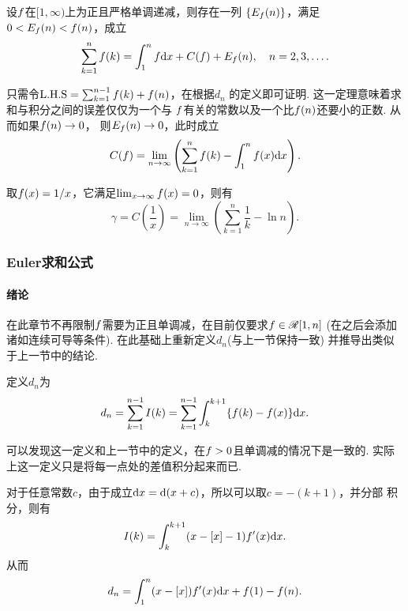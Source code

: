     \begin{thm}
      设$\mathnormal{f}$在$[1,\infty)$上为正且严格单调递减，则存在一列
      $\{E_{\mathnormal{f}}(n)\}$，满足$0<E_{\mathnormal{f}}(n) < \mathnormal{f}(n)$，成立
      \begin{equation}
        \sum_{k=1}^n\mathnormal{f}(k) = \int_1^n\mathnormal{f}\mathrm{d} x + C(\mathnormal{f}) + E_{\mathnormal{f}}(n),
        \quad n = 2,3,\dots.
      \end{equation}
    \end{thm}
    \remark
      只需令$\text{L.H.S} = \sum_{k=1}^{n-1}\mathnormal{f}(k) + \mathnormal{f}(n)$，在根据$d_n$
      的定义即可证明. 这一定理意味着求和与积分之间的误差仅仅为一个与
      $\mathnormal{f}$有关的常数以及一个比$\mathnormal{f}(n)$还要小的正数. 从而如果$\mathnormal{f}(n)\to 0$，
      则$E_{\mathnormal{f}}(n)\to 0$，此时成立
      \begin{equation}
        C(\mathnormal{f}) = \lim_{n\to\infty}\left(
          \sum_{k=1}^n \mathnormal{f}(k) - \int_1^n\mathnormal{f}(x)\mathrm{d} x
        \right).
      \end{equation}

    \begin{defi}[经典Euler常数]
      取$\mathnormal{f}(x) = 1/x$，它满足$\lim_{x\to\infty}\mathnormal{f}(x) = 0$，则有
      \[
        \gamma = C(\frac{1}{x}) = \lim_{n\to\infty}\left(
          \sum_{k=1}^n\frac{1}{k} - \ln n
        \right).
      \]
    \end{defi}

  \subsubsection{Euler求和公式}
    \paragraph{绪论}
      在此章节不再限制$\mathnormal{f}$需要为正且单调减，在目前仅要求$\mathnormal{f}\in\mathscr{R}[1, n]$
      (在之后会添加诸如连续可导等条件). 在此基础上重新定义$d_n$(与上一节保持一致)
      并推导出类似于上一节中的结论.

    \begin{defi}[$d_n$]
      定义$d_n$为
      \begin{equation}
        d_n = \sum_{k=1}^{n-1}I(k) =
        \sum_{k=1}^{n-1} \int_{k}^{k+1}\{ \mathnormal{f}(k) - \mathnormal{f}(x) \}\mathrm{d} x.
      \end{equation}
    \end{defi}
    \remark
      可以发现这一定义和上一节中的定义，在$\mathnormal{f}>0$且单调减的情况下是一致的.
      实际上这一定义只是将每一点处的差值积分起来而已.

    \begin{pos}
      对于任意常数$c$，由于成立$\mathrm{d} x= \mathrm{d}(x+c)$，所以可以取$c=-(k+1)$，并分部
      积分，则有
      \[
        I(k) = \int_{k}^{k+1} (x-[x]-1)\mathnormal{f}^\prime(x)\mathrm{d} x.
      \]
      从而
      \[
        d_n = \int_1^n(x-[x])\mathnormal{f}^\prime(x)\mathrm{d} x + \mathnormal{f}(1) - \mathnormal{f}(n).
      \]
    \end{pos}

